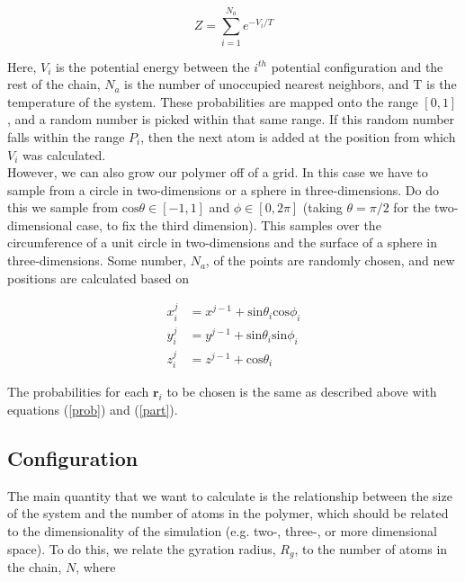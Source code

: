\documentclass{article}
\begin{document}
\begin{multicols}{2}
\begin{equation}
\label{part}
Z = \sum \limits _{i=1}^{N_a} e^{-V_i/T}
\end{equation}

\noindent Here, $V_i$ is the potential energy between the $i^{th}$ potential configuration and the rest of the chain, $N_a$ is the number of unoccupied nearest neighbors, and T is the temperature of the system.  These probabilities are mapped onto the range $[0,1]$, and a random number is picked within that same range.  If this random number falls within the range $P_i$, then the next atom is added at the position from which $V_i$ was calculated.  \\

However, we can also grow our polymer off of a grid.  In this case we have to sample from a circle in two-dimensions or a sphere in three-dimensions.  Do do this we sample from $\mathrm{cos}\theta \in [-1,1]$ and $\phi \in [0,2\pi]$ (taking $\theta = \pi/2$ for the two-dimensional case, to fix the third dimension).  This samples over the circumference of a unit circle in two-dimensions and the surface of a sphere in three-dimensions.  Some number, $N_a$, of the points are randomly chosen, and new positions are calculated based on 

\begin{equation}
\begin{split}
x^{j}_i & = x^{j-1} + \mathrm{sin}\theta _i \mathrm{cos}\phi _i \\
y^{j}_i & = y^{j-1} + \mathrm{sin} \theta _i \mathrm{sin} \phi _i \\
z^{j}_i & = z^{j-1} + \mathrm{cos} \theta _i
\end{split}
\end{equation}

\noindent The probabilities for each $\textbf{r}_i$ to be chosen is the same as described above with equations (\ref{prob}) and (\ref{part}).

\subsection{Configuration}

The main quantity that we want to calculate is the relationship between the size of the system and the number of atoms in the polymer, which should be related to the dimensionality of the simulation (e.g. two-, three-, or more dimensional space).  To do this, we relate the gyration radius, $R_g$, to the number of atoms in the chain, $N$, where 


\end{multicols}
\end{document}

